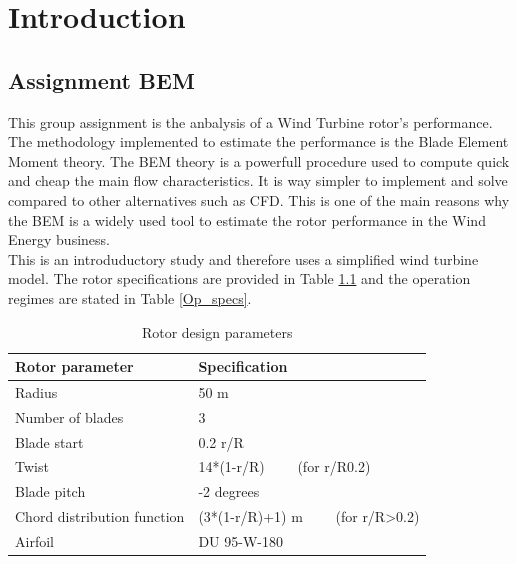 \chapter{Introduction}

\section{Assignment BEM }

This group assignment is the anbalysis of a Wind Turbine rotor's performance. The methodology implemented to estimate the performance is the Blade Element Moment theory. The BEM theory is a powerfull procedure used to compute quick and cheap the main flow characteristics. It is way simpler to implement and solve compared to other alternatives such as CFD. This is one of the main reasons why the BEM is a widely used tool to estimate the rotor performance in the Wind Energy business. \\

This is an introduductory study and therefore uses a simplified wind turbine model. The rotor specifications are provided in Table \ref{Rot_specs} and the operation regimes are stated in Table \ref{Op_specs}.

\begin{table}
\centering
\caption{Rotor design parameters}
\begin{tabular}{|l|l|} 
\hline
\textbf{Rotor parameter}    & \textbf{Specification}                             \\ 
\hline
Radius                      & 50 m                                               \\ 
\hline
Number of blades            & 3                                                  \\ 
\hline
Blade start                 & 0.2 r/R                                            \\ 
\hline
Twist                       & 14*(1-r/R)~~~~ (for r/R0.2)                       \\ 
\hline
Blade pitch                 & -2 degrees                                         \\ 
\hline
Chord distribution function & (3*(1-r/R)+1) m~~~~ (for r/R\textgreater{}0.2)   \\ 
\hline
Airfoil                     & DU 95-W-180                                        \\
\hline
\end{tabular}
\label{Rot_specs}
\end{table}  

